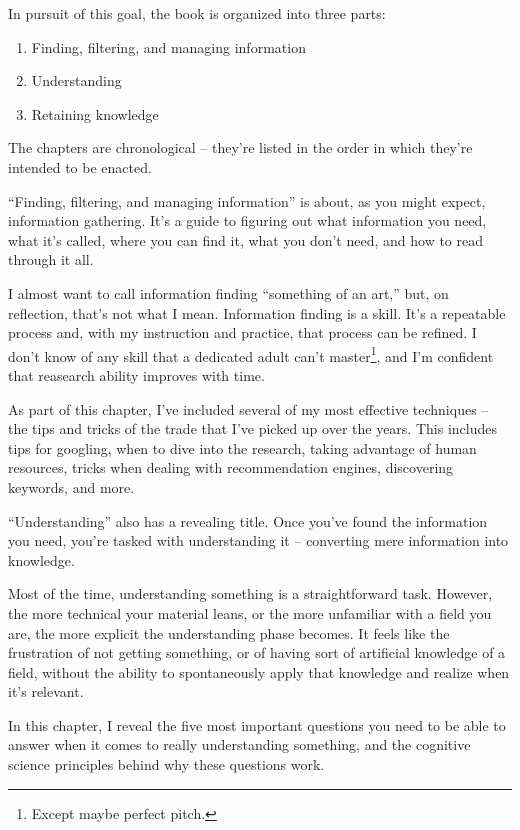 In pursuit of this goal, the book is organized into three parts:

\begin{enumerate}
  \item Finding, filtering, and managing information
  \item Understanding
  \item Retaining knowledge
\end{enumerate}

The chapters are chronological -- they're listed in the order in which they're intended to be enacted.

 ``Finding, filtering, and managing information'' is about, as you might expect, information gathering. It's a guide
to figuring out what information you need, what it's called, where you can find
it, what you don't need, and how to read through it all.

I almost want to call information finding ``something of an art,'' but, on reflection,
that's not what I mean. Information finding is a skill. It's a repeatable
process and, with my instruction and practice, that process can be
refined. I don't know of any skill that a dedicated adult can't
master\footnote{Except maybe perfect pitch.}, and I'm confident that reasearch ability improves with time.

As part of this chapter, I've included several of my most effective techniques
-- the tips and tricks of the trade that I've picked up over the years. This
includes tips for googling, when to dive into the research, taking advantage of human resources, tricks when dealing with recommendation engines,
discovering keywords, and more.

 ``Understanding'' also has a revealing title. Once you've found the information you need, you're tasked with
understanding it -- converting mere information into
knowledge.

Most of the time, understanding something is a straightforward task. However,
the more technical your material leans, or the more unfamiliar with a field you
are, the more explicit the understanding phase becomes. It feels
like the frustration of not getting something, or of having sort of artificial
knowledge of a field, without the ability to spontaneously apply that knowledge and
realize when it's relevant.

In this chapter, I reveal the five most important questions you need to be able to
answer when it comes to really understanding something, and the cognitive science principles behind why these questions
work.

